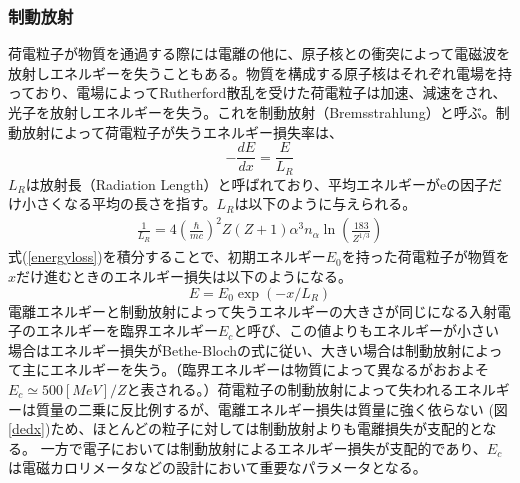 \subsubsection{制動放射}
荷電粒子が物質を通過する際には電離の他に、原子核との衝突によって電磁波を放射しエネルギーを失うこともある。物質を構成する原子核はそれぞれ電場を持っており、電場によってRutherford散乱を受けた荷電粒子は加速、減速をされ、光子を放射しエネルギーを失う。これを制動放射（Bremsstrahlung）と呼ぶ。制動放射によって荷電粒子が失うエネルギー損失率は、
\begin{equation}
	\label{energyloss}
	- { \frac{dE}{dx} } = \frac{E}{L_R}
\end{equation}
$L_R$は放射長（Radiation Length）と呼ばれており、平均エネルギーがeの因子だけ小さくなる平均の長さを指す。$L_R$は以下のように与えられる。
\begin{align}
\frac{1}{L_R} = 4 {\left( \frac{\hbar}{mc} \right)}^2 Z (Z+1) {\alpha}^3 n_{\alpha} \ln(\frac{183}{Z^{1/3}})
\end{align}
式(\ref{energyloss})を積分することで、初期エネルギー$E_0$を持った荷電粒子が物質を$x$だけ進むときのエネルギー損失は以下のようになる。
\begin{equation}
E = E_0 \exp(-x/L_R)
\end{equation}
電離エネルギーと制動放射によって失うエネルギーの大きさが同じになる入射電子のエネルギーを臨界エネルギー$E_c$と呼び、この値よりもエネルギーが小さい場合はエネルギー損失がBethe-Blochの式に従い、大きい場合は制動放射によって主にエネルギーを失う。（臨界エネルギーは物質によって異なるがおおよそ$E_c \simeq 500[MeV] / Z$と表される。）荷電粒子の制動放射によって失われるエネルギーは質量の二乗に反比例するが、電離エネルギー損失は質量に強く依らない (図\ref{dedx})ため、ほとんどの粒子に対しては制動放射よりも電離損失が支配的となる。 一方で電子においては制動放射によるエネルギー損失が支配的であり、$E_c$は電磁カロリメータなどの設計において重要なパラメータとなる。
